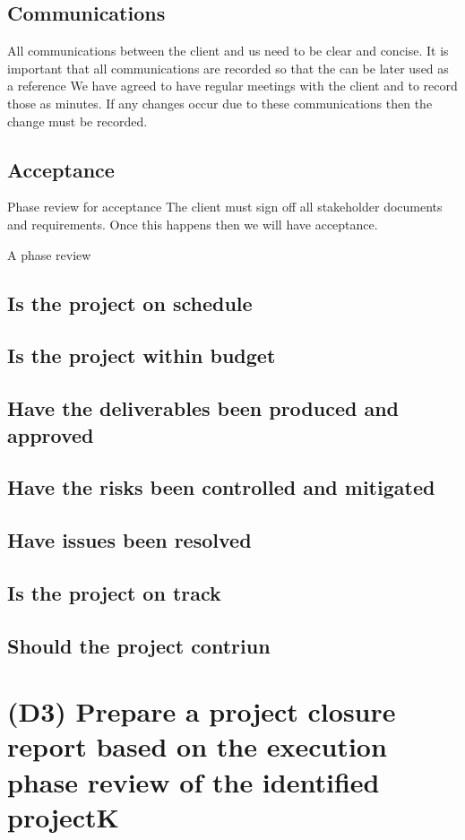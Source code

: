 \documentclass{article}
\begin{document}
\subsection{Communications}
All communications between the client and us need to be clear and concise.
It is important that all communications are recorded so that the can be later used as a reference
We have agreed to have regular meetings with the client and to record those as minutes.
If any changes occur due to these communications then the change must be recorded.

\subsection{Acceptance}

Phase review for acceptance
The client must sign off all stakeholder documents and requirements.
Once this happens then we will have acceptance.

A phase review
		\subsection{Is the project on schedule}
		\subsection{Is the project within budget}
		\subsection{Have the deliverables been produced and approved}
		\subsection{Have the risks been controlled and mitigated}
		\subsection{Have issues been resolved}
		\subsection{Is the project on track}
		\subsection{Should the project contriun}


\section{(D3) Prepare a project closure report based on the execution phase review of the identified projectK}
\end{document}
